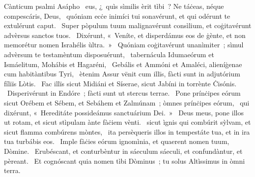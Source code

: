 { Cànticum psalmi Asápho}
{%
~eus, ¿~quìs sìmilis èrit tìbi~? Ne táċeas, néque compescáris, Deus, 
~quóniam ecċe inimíci tui sonavérunt, et qui odérunt te extulérunt caput. 
~Super pòpulum tuum malignavérunt consìlium, et coġitavérunt advèrsus sanctos tuos. 
~Dixérunt, «~Veníte, et disperdámus eos de ġènte, et non memorétur nomen Israhélis ùltra.~» 
~Quóniam coġitavérunt unanìmiter~; sìmul advèrsum te testamèntum disposuérunt, 
~tabernácula Idumaeórum et Ismáelitum, Mohábis et Hagaréni, 
~Gebális et Ammóni et Amaléci, alieníġenae cum habitàntibus Tyri, 
~ètenim Assur vënit cum illïs, fàcti sunt in adjutórium fíliïs Lòtis. 
~Fac illïs sicut Midiáni et Síserae, sicut Jabíni in torrènte Ċisónis. 
~Disperivérunt in Endóre~; fàcti sunt ut stercus terrae. 
~Pone prínċipes eórum sicut Orébem et Sébem, et Sebáhem et Zalmúnam~; òmnes prínċipes eórum, 
~qui dixérunt, «~Hereditáte possideámus sanctuárium Dei.~»
~Deus meus, pone illos ut rotam, et sicut stìpulam ànte fàċiem vènti. 
~sicut ìgnis qui combúrit sỳlvam, et sicut flamma combúrens mòntes, 
~ita persèqueris illos in tempestáte tua, et in ira tua turbábis eos. 
~Imple fàċies eórum ignomìnia, et quaerent nomen tuum, Dòmine. 
~Erubéscant, et conturbèntur in sáeculum sáeculi, et confundàntur, et pèreant. 
~Et cognóscant quia nomen tìbi Dòminus~; tu solus Altìssimus in òmni terra. 
}
